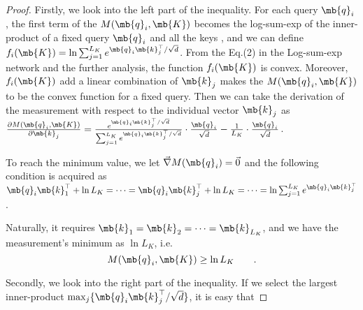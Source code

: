 \begin{appendices}
\begin{proof}
Firstly, we look into the left part of the inequality. For each query $\mb{q}_i$,  the first term of the $M(\mb{q}_i, \mb{K})$ becomes the log-sum-exp of the inner-product of a fixed query $\mb{q}_i$ and all the keys , and we can define $f_i(\mb{K})=\ln \sum_{j=1}^{L_K} e^{{\mb{q}_i\mb{k}_j^{\top}}/{\sqrt{d}}}$. From the Eq.(2) in the Log-sum-exp network\cite{DBLP:journals/corr/abs-1806-07850} and the further analysis, the function $f_i(\mb{K})$ is convex. Moreover, $f_i(\mb{K})$ add a linear combination of $\mb{k}_j$ makes the $M(\mb{q}_i, \mb{K})$ to be the convex function for a fixed query. Then we can take the derivation of the measurement with respect to the individual vector $\mb{k}_j$ as $\frac{\partial M(\mb{q}_i, \mb{K})}{\partial \mb{k}_j} = \frac{e^{\mb{q}_i\mb{k}_j^{\top}/{\sqrt{d}}}}{\sum_{j=1}^{L_K} e^{\mb{q}_i\mb{k}_j^{\top}/{\sqrt{d}}}} \cdot \frac{\mb{q}_i}{\sqrt{d}} - \frac{1}{L_K} \cdot \frac{\mb{q}_i}{\sqrt{d}}$.
\iffalse
\begin{equation}
\nonumber
    \frac{\partial M(\mb{q}_i, \mb{K})}{\partial \mb{k}_j} = \frac{e^{\mb{q}_i\mb{k}_j^{\top}/{\sqrt{d}}}}{\sum_{j=1}^{L_K} e^{\mb{q}_i\mb{k}_j^{\top}/{\sqrt{d}}}} \cdot \frac{\mb{q}_i}{\sqrt{d}} - \frac{1}{L_K} \cdot \frac{\mb{q}_i}{\sqrt{d}} \qquad,
\end{equation}
\fi
To reach the minimum value, we let $\vec{\nabla} M(\mb{q}_i) = \vec{0}$ and the following condition is acquired as $\mb{q}_i\mb{k}_1^{\top} + \ln L_K = \cdots = \mb{q}_i\mb{k}_j^{\top} + \ln L_K = \cdots = \ln \sum_{j=1}^{L_K} e^{\mb{q}_i\mb{k}_j^{\top}}$.
\iffalse
\begin{equation}
\nonumber
    \mb{q}_i\mb{k}_1^{\top} + \ln L_K = \cdots = \mb{q}_i\mb{k}_j^{\top} + \ln L_K = \cdots = \ln \sum_{j=1}^{L_K} e^{\mb{q}_i\mb{k}_j^{\top}} \quad.
\end{equation}
\fi
Naturally, it requires $\mb{k}_1=\mb{k}_2=\cdots=\mb{k}_{L_K}$, and we have the measurement's minimum as $\ln L_K$, i.e.
\begin{equation}
\label{eq.appendix.proof1.left}
    M(\mb{q}_i, \mb{K}) \geq \ln L_K \qquad.
\end{equation}

Secondly, we look into the right part of the inequality. If we select the largest inner-product $\max_{j}\{{\mb{q}_i \mb{k}_j^{\top}}/{\sqrt{d}}\}$, it is easy that


\end{proof}
\end{appendices}

